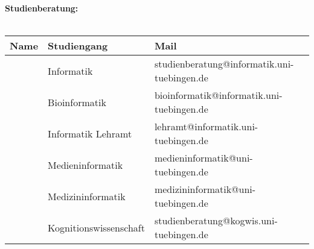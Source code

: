 \textbf{Studienberatung:}\\\\
\begin{tabular}{|lll|}
	\hline
	Name                 & Studiengang                  & Mail                                                                       \\
	\hline
	\hline
	\studBeratungInfo    & Informatik                   & studienberatung@informatik.uni-tuebingen.de\footnotemark[\value{footnote}] \\
	\studBeratungBio     & Bioinformatik                & bioinformatik@informatik.uni-tuebingen.de\footnotemark[\value{footnote}]   \\
	\studBeratungLehramt & Informatik Lehramt           & lehramt@informatik.uni-tuebingen.de\footnotemark[\value{footnote}]         \\
	\studBeratungMedien  & Medieninformatik             & medieninformatik@uni-tuebingen.de\footnotemark[\value{footnote}]           \\
	\studBeratungMedizin & Medizininformatik            & medizininformatik@uni-tuebingen.de\footnotemark[\value{footnote}]          \\
	\studBeratungKogni   & Kognitionswissenschaft       & studienberatung@kogwis.uni-tuebingen.de\footnotemark[\value{footnote}]         \\
	\hline
\end{tabular}
\vfill
{}
\normalsize
